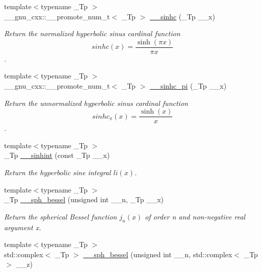 \begin{DoxyCompactItemize}
{\footnotesize template$<$typename \+\_\+\+Tp $>$ }\\\+\_\+\+\_\+gnu\+\_\+cxx\+::\+\_\+\+\_\+promote\+\_\+num\+\_\+t$<$ \+\_\+\+Tp $>$ \hyperlink{namespacestd_1_1____detail_a355f2af77d2628ffdd4529dd24aea7a4}{\+\_\+\+\_\+sinhc} (\+\_\+\+Tp \+\_\+\+\_\+x)
\begin{DoxyCompactList}\small\item\em Return the normalized hyperbolic sinus cardinal function \[ sinhc(x) = \frac{\sinh(\pi x)}{\pi x} \]. \end{DoxyCompactList}\item 
{\footnotesize template$<$typename \+\_\+\+Tp $>$ }\\\+\_\+\+\_\+gnu\+\_\+cxx\+::\+\_\+\+\_\+promote\+\_\+num\+\_\+t$<$ \+\_\+\+Tp $>$ \hyperlink{namespacestd_1_1____detail_a7e55ee1169f683db5530dc90c037c09f}{\+\_\+\+\_\+sinhc\+\_\+pi} (\+\_\+\+Tp \+\_\+\+\_\+x)
\begin{DoxyCompactList}\small\item\em Return the unnormalized hyperbolic sinus cardinal function \[ sinhc_\pi(x) = \frac{\sinh(x)}{x} \]. \end{DoxyCompactList}\item 
{\footnotesize template$<$typename \+\_\+\+Tp $>$ }\\\+\_\+\+Tp \hyperlink{namespacestd_1_1____detail_ac629f9c743a716608af2007d2e34438d}{\+\_\+\+\_\+sinhint} (const \+\_\+\+Tp \+\_\+\+\_\+x)
\begin{DoxyCompactList}\small\item\em Return the hyperbolic sine integral $ li(x) $. \end{DoxyCompactList}\item 
{\footnotesize template$<$typename \+\_\+\+Tp $>$ }\\\+\_\+\+Tp \hyperlink{namespacestd_1_1____detail_ac2ae8a144f79bd793e1b5d80a3b082b1}{\+\_\+\+\_\+sph\+\_\+bessel} (unsigned int \+\_\+\+\_\+n, \+\_\+\+Tp \+\_\+\+\_\+x)
\begin{DoxyCompactList}\small\item\em Return the spherical Bessel function $ j_n(x) $ of order n and non-\/negative real argument {\ttfamily x}. \end{DoxyCompactList}\item 
{\footnotesize template$<$typename \+\_\+\+Tp $>$ }\\std\+::complex$<$ \+\_\+\+Tp $>$ \hyperlink{namespacestd_1_1____detail_a28646bd01903e6da9871069a9363c593}{\+\_\+\+\_\+sph\+\_\+bessel} (unsigned int \+\_\+\+\_\+n, std\+::complex$<$ \+\_\+\+Tp $>$ \+\_\+\+\_\+z)

\end{DoxyCompactItemize}

